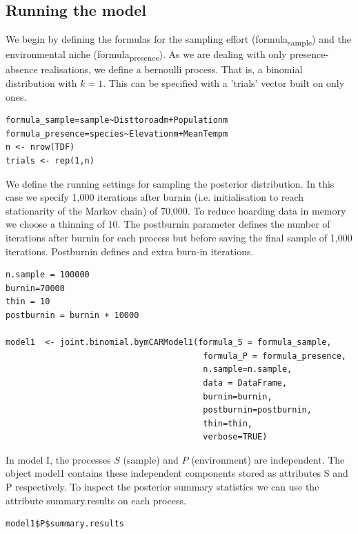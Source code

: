 \documentclass[11pt]{article}
\begin{document}
\subsection{Running the model}
\label{sec:orge28e344}
We begin by defining the formulas for the sampling effort (formula\textsubscript{sample}) and the environmental niche (formula\textsubscript{presence}).
As we are dealing with only presence-absence realisations, we define a bernoulli process. That is, a binomial distribution with \(k=1\).
This can be specified with a 'trials' vector built on only ones.
\begin{verbatim}
formula_sample=sample~Disttoroadm+Populationm
formula_presence=species~Elevationm+MeanTempm
n <- nrow(TDF)
trials <- rep(1,n)
\end{verbatim}

We define the running settings for sampling the posterior distribution. In this case we specify 1,000 iterations after burnin (i.e. initialisation to reach stationarity of the Markov chain) of 70,000. To reduce hoarding data in memory we choose a thinning of 10. The postburnin parameter defines the number of iterations after burnin for each process but before saving the final sample of 1,000 iterations. Postburnin defines and extra burn-in iterations.
\begin{verbatim}
n.sample = 100000
burnin=70000
thin = 10
postburnin = burnin + 10000

model1  <- joint.binomial.bymCARModel1(formula_S = formula_sample,
                                        formula_P = formula_presence,
                                        n.sample=n.sample,
                                        data = DataFrame,
                                        burnin=burnin,
                                        postburnin=postburnin,
                                        thin=thin,
                                        verbose=TRUE)
\end{verbatim}

In model I, the processes \(S\) (sample) and \(P\) (environment) are independent. The object model1 contains these independent components stored as attributes S and P respectively. To inspect the posterior summary statistics we can use the attribute summary.results on each process.

\begin{verbatim}
model1$P$summary.results
\end{verbatim}
\end{document}
